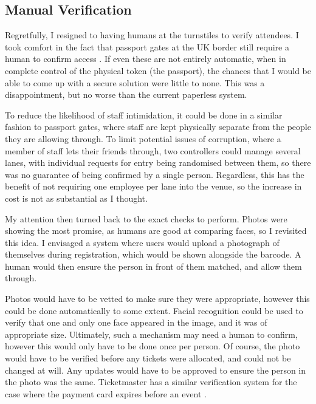 \documentclass[12pt,a4paper]{bhamdissertation}
\begin{document}
\subsection{Manual Verification}

Regretfully, I resigned to having humans at the turnstiles to verify attendees. I took comfort in the fact that passport gates at the UK border still require a human to confirm access \cite{Ba16}. If even these are not entirely automatic, when in complete control of the physical token (the passport), the chances that I would be able to come up with a secure solution were little to none. This was a disappointment, but no worse than the current paperless system.

To reduce the likelihood of staff intimidation, it could be done in a similar fashion to passport gates, where staff are kept physically separate from the people they are allowing through. To limit potential issues of corruption, where a member of staff lets their friends through, two controllers could manage several lanes, with individual requests for entry being randomised between them, so there was no guarantee of being confirmed by a single person. Regardless, this has the benefit of not requiring one employee per lane into the venue, so the increase in cost is not as substantial as I thought.

My attention then turned back to the exact checks to perform. Photos were showing the most promise, as humans are good at comparing faces, so I revisited this idea. I envisaged a system where users would upload a photograph of themselves during registration, which would be shown alongside the barcode. A human would then ensure the person in front of them matched, and allow them through.

Photos would have to be vetted to make sure they were appropriate, however this could be done automatically to some extent. Facial recognition could be used to verify that one and only one face appeared in the image, and it was of appropriate size. Ultimately, such a mechanism may need a human to confirm, however this would only have to be done once per person. Of course, the photo would have to be verified before any tickets were allocated, and could not be changed at will. Any updates would have to be approved to ensure the person in the photo was the same. Ticketmaster has a similar verification system for the case where the payment card expires before an event \cite{T166}.
\end{document}

